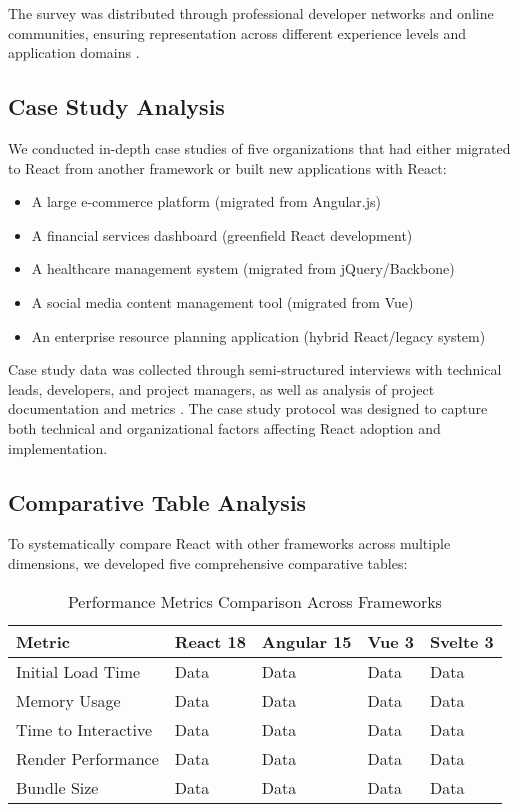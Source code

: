 The survey was distributed through professional developer networks and online communities, ensuring representation across different experience levels and application domains \cite{kumar2021}.

\subsection{Case Study Analysis}
We conducted in-depth case studies of five organizations that had either migrated to React from another framework or built new applications with React:

\begin{itemize}
    \item A large e-commerce platform (migrated from Angular.js)
    \item A financial services dashboard (greenfield React development)
    \item A healthcare management system (migrated from jQuery/Backbone)
    \item A social media content management tool (migrated from Vue)
    \item An enterprise resource planning application (hybrid React/legacy system)
\end{itemize}

Case study data was collected through semi-structured interviews with technical leads, developers, and project managers, as well as analysis of project documentation and metrics \cite{williams2022}. The case study protocol was designed to capture both technical and organizational factors affecting React adoption and implementation.

\subsection{Comparative Table Analysis}
To systematically compare React with other frameworks across multiple dimensions, we developed five comprehensive comparative tables:

\begin{table}[H]
\caption{Performance Metrics Comparison Across Frameworks}
\label{tab:performance}
\centering
\begin{tabularx}{\textwidth}{lXXXX}
\toprule
\textbf{Metric} & \textbf{React 18} & \textbf{Angular 15} & \textbf{Vue 3} & \textbf{Svelte 3} \\
\midrule
Initial Load Time & Data & Data & Data & Data \\
Memory Usage & Data & Data & Data & Data \\
Time to Interactive & Data & Data & Data & Data \\
Render Performance & Data & Data & Data & Data \\
Bundle Size & Data & Data & Data & Data \\
\bottomrule
\end{tabularx}
\end{table}

